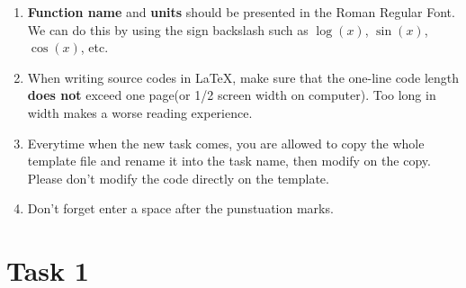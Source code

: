 \documentclass[fontsize=11pt]{scrartcl}
\begin{document}
\begin{enumerate}
    \item  \textbf{Function name} and \textbf{units} should be presented in the Roman Regular Font.
    We can do this by using the sign backslash such as $\log(x)$, $\sin(x)$, $\cos(x)$, etc.
    \item When writing source codes in \LaTeX, make sure that the one-line code length 
    \textbf{does not} exceed one page(or 1/2 screen width on computer). Too long in width makes 
    a worse reading experience.
    \item Everytime when the new task comes, you are allowed to copy the whole template file and 
    rename it into the task name, then modify on the copy. Please don't modify the code directly
    on the template.
    \item Don't forget enter a space after the punstuation marks.
\end{enumerate}



\pagebreak
\section{Task 1}
\end{document}
